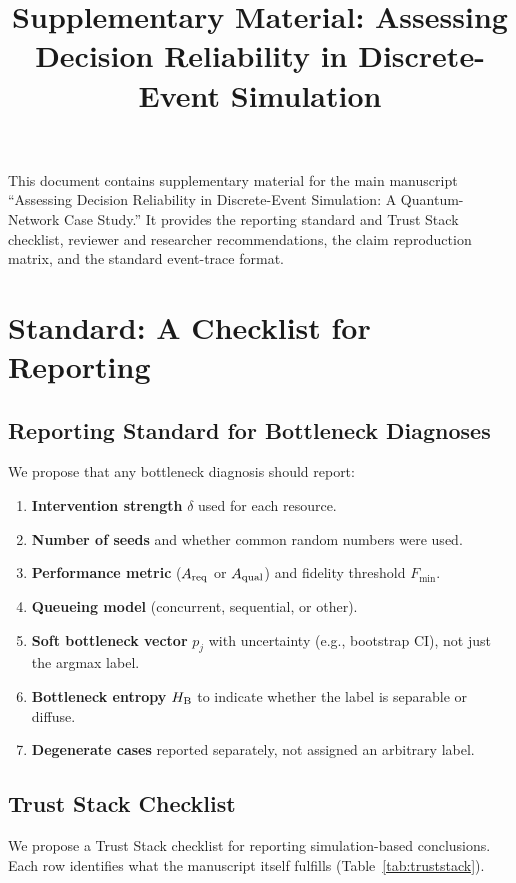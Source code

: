 \documentclass{ams-journal}
\title{Supplementary Material: Assessing Decision Reliability in Discrete-Event Simulation}
\affiliation{\textsuperscript{1}Vesterlund Ventures, WestQuant Open}
\newcommand{\Areq}{A_{\rm req}}
\newcommand{\Aqual}{A_{\rm qual}}
\newcommand{\HB}{H_{\rm B}}
\begin{document}
\maketitle

This document contains supplementary material for the main manuscript ``Assessing Decision Reliability in Discrete-Event Simulation: A Quantum-Network Case Study.'' It provides the reporting standard and Trust Stack checklist, reviewer and researcher recommendations, the claim reproduction matrix, and the standard event-trace format.

\section{Standard: A Checklist for Reporting}
\label{sec:standard}

\subsection{Reporting Standard for Bottleneck Diagnoses}

We propose that any bottleneck diagnosis should report:
\begin{enumerate}[leftmargin=2em]
\item \textbf{Intervention strength} $\delta$ used for each resource.
\item \textbf{Number of seeds} and whether common random numbers were used.
\item \textbf{Performance metric} ($\Areq$ or $\Aqual$) and fidelity threshold $F_{\min}$.
\item \textbf{Queueing model} (concurrent, sequential, or other).
\item \textbf{Soft bottleneck vector} $p_j$ with uncertainty (e.g., bootstrap CI), not just the argmax label.
\item \textbf{Bottleneck entropy} $\HB$ to indicate whether the label is separable or diffuse.
\item \textbf{Degenerate cases} reported separately, not assigned an arbitrary label.
\end{enumerate}

\subsection{Trust Stack Checklist}

We propose a Trust Stack checklist for reporting simulation-based conclusions. Each row identifies what the manuscript itself fulfills (Table~\ref{tab:truststack}).
\end{document}
